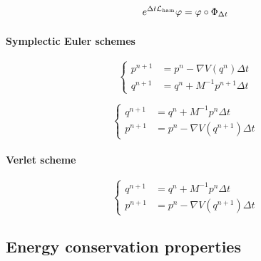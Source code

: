     $$e^{\Delta t \mathcal{L}_{\rm ham}}\varphi =\varphi \circ \Phi_{\Delta t}$$
    



    \paragraph{Symplectic Euler schemes}
    
    \begin{equation}\label{symplectic_euler_A}
    \left\{\begin{aligned}
         p^{n+1} &=p^n -\nabla V(q^n)\Delta t\\
         q^{n+1} &=q^n + M^{-1}p^{n+1}\Delta t
    \end{aligned}\right.
    \end{equation}

    \begin{equation}\label{symplectic_euler_B}
        \left\{\begin{aligned}
             q^{n+1} &=q^n +M^{-1}p^n\Delta t\\
             p^{n+1} &=p^n - \nabla V(q^{n+1})\Delta t
        \end{aligned}\right.
    \end{equation}
    
    \paragraph{Verlet scheme}

    \begin{equation}\label{verlet}
        \left\{\begin{aligned}
             q^{n+1} &=q^n +M^{-1}p^n\Delta t\\
             p^{n+1} &=p^n - \nabla V(q^{n+1})\Delta t
        \end{aligned}\right.
    \end{equation}

    \subsection{Energy conservation properties}


